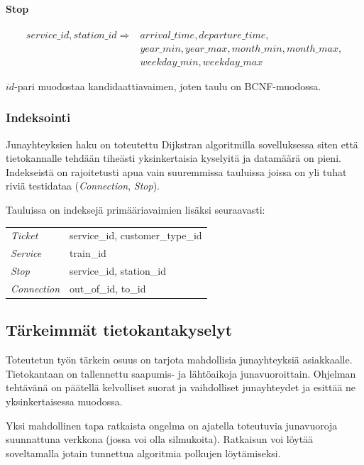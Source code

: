 \documentclass[a4paper,twoside,titlepage,12pt]{article}
\begin{document}
\paragraph{Stop}

\begin{align*}
service\_id, station\_id \Rightarrow &arrival\_time, departure\_time,\\
&year\_min, year\_max, month\_min, month\_max,\\
&weekday\_min, weekday\_max
\end{align*}

$id$-pari muodostaa kandidaattiavaimen, joten taulu on BCNF-muodossa.

\subsubsection{Indeksointi}
Junayhteyksien haku on toteutettu Dijkstran algoritmilla sovelluksessa siten että tietokannalle tehdään tiheästi yksinkertaisia kyselyitä ja datamäärä on pieni. Indekseistä on rajoitetusti apua vain suuremmissa tauluissa joissa on yli tuhat riviä testidataa (\emph{Connection}, \emph{Stop}).

Tauluissa on indeksejä primääriavaimien lisäksi seuraavasti:

\begin{tabular}{ll}
\emph{Ticket} & service\_id, customer\_type\_id\\
\emph{Service} & train\_id\\
\emph{Stop} & service\_id, station\_id\\
\emph{Connection} & out\_of\_id, to\_id\\
\end{tabular}

\subsection{Tärkeimmät tietokantakyselyt}

Toteutetun työn tärkein osuus on tarjota mahdollisia junayhteyksiä asiakkaalle. Tietokantaan on tallennettu saapumis- ja lähtöaikoja junavuoroittain. Ohjelman tehtävänä on päätellä kelvolliset suorat ja vaihdolliset junayhteydet ja esittää ne yksinkertaisessa muodossa.

Yksi mahdollinen tapa ratkaista ongelma on ajatella toteutuvia junavuoroja suunnattuna verkkona (jossa voi olla silmukoita). Ratkaisun voi löytää soveltamalla jotain tunnettua algoritmia polkujen löytämiseksi.
\end{document}
